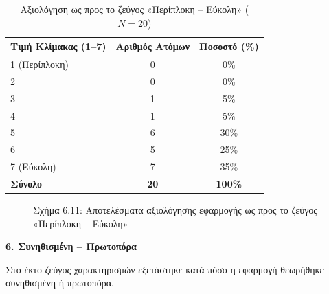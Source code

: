 \documentclass[twoside, a4paper, 11pt]{article}
\begin{document}
\begin{table}[H]
    \centering
    \caption{Αξιολόγηση ως προς το ζεύγος «Περίπλοκη – Εύκολη» ($N = 20$)}
    \begin{tabular}{|l|c|c|}
        \hline
        \textbf{Τιμή Κλίμακας (1–7)} & \textbf{Αριθμός Ατόμων} & \textbf{Ποσοστό (\%)} \\ \hline
        1 (Περίπλοκη) & 0 & 0\% \\ \hline
        2 & 0 & 0\% \\ \hline
        3 & 1 & 5\% \\ \hline
        4 & 1 & 5\% \\ \hline
        5 & 6 & 30\% \\ \hline
        6 & 5 & 25\% \\ \hline
        7 (Εύκολη) & 7 & 35\% \\ \hline
        \textbf{Σύνολο} & \textbf{20} & \textbf{100\%} \\ \hline
    \end{tabular}
\end{table}

\begin{figure}[H]
    \centering
    \caption{Σχήμα 6.11: Αποτελέσματα αξιολόγησης εφαρμογής ως προς το ζεύγος «Περίπλοκη – Εύκολη»}
\end{figure}

\vspace{1em}
\noindent\textbf{6. Συνηθισμένη – Πρωτοπόρα}

Στο έκτο ζεύγος χαρακτηρισμών εξετάστηκε κατά πόσο η εφαρμογή θεωρήθηκε συνηθισμένη ή πρωτοπόρα.
\end{document}
